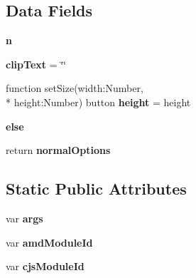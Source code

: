 \subsection*{Data Fields}
\begin{DoxyCompactItemize}
\item 
\hypertarget{class_zero_clipboard_aeab71244afb687f16d8c4f5ee9d6ef0e}{{\bfseries n}}\label{class_zero_clipboard_aeab71244afb687f16d8c4f5ee9d6ef0e}

\item 
\hypertarget{class_zero_clipboard_a431148592df180ed57ba944f5ed16357}{{\bfseries clip\-Text} = \char`\"{}\char`\"{}}\label{class_zero_clipboard_a431148592df180ed57ba944f5ed16357}

\item 
\hypertarget{class_zero_clipboard_a66f623f993aa7c14b069114477981bf6}{function set\-Size(width\-:\-Number, \\*
height\-:\-Number) button {\bfseries height} = height}\label{class_zero_clipboard_a66f623f993aa7c14b069114477981bf6}

\item 
{\bfseries else}
\item 
\hypertarget{class_zero_clipboard_ac4826f8ecd8f25bd9531382c4ac5c165}{return {\bfseries normal\-Options}}\label{class_zero_clipboard_ac4826f8ecd8f25bd9531382c4ac5c165}

\end{DoxyCompactItemize}
\subsection*{Static Public Attributes}
\begin{DoxyCompactItemize}
\item 
\hypertarget{class_zero_clipboard_a64e5c861448a80a00f5c93e96de17d7a}{var {\bfseries args}}\label{class_zero_clipboard_a64e5c861448a80a00f5c93e96de17d7a}

\item 
var {\bfseries amd\-Module\-Id}
\item 
var {\bfseries cjs\-Module\-Id}
\end{DoxyCompactItemize}


